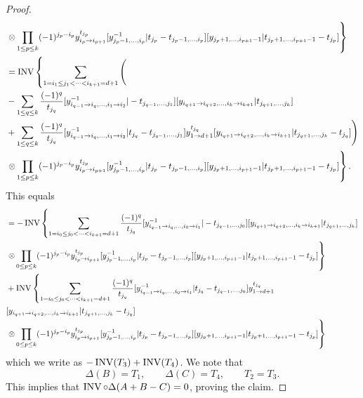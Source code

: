\begin{proof}
\begin{equation}
\begin{aligned}
&\left.\otimes\prod_{1\leq p\leq k}(-1)^{j_p-i_p}y_{i_p\to i_{p+1}}^{t_{j_p}}[y_{j_p-1,\dots,i_p}^{-1}|t_{j_p}-t_{j_p-1,\dots,i_p}][y_{j_p+1,\dots,i_{p+1}-1}|t_{j_p+1,\dots,i_{p+1}-1}-t_{j_p}]\right\}\\
&=\operatorname{INV}\left\{\sum_{1=i_1\leq j_1<\dots<i_{k+1}=d+1}\Bigg(\right.\\
&-\sum_{1\leq q\leq k}\frac{(-1)^q}{t_{j_q}}[y_{i_{q-1}\to i_q,\dots,i_1\to i_2}^{-1}|-t_{j_{q-1},\dots,j_1}][y_{i_{q+1}\to i_{q+2},\dots,i_k\to i_{k+1}}|t_{j_{q+1},\dots,j_k}]\\
&+\sum_{1\leq q\leq k}\frac{(-1)^q}{t_{j_q}}[y_{i_{q-1}\to i_q,\dots,i_1\to i_2}^{-1}|t_{j_q}-t_{j_{q-1},\dots,j_1}]y_{1\to d+1}^{t_{j_q}}[y_{i_{q+1}\to i_{q+2},\dots,i_k\to i_{k+1}}|t_{j_{q+1},\dots,j_k}-t_{j_q}]\Bigg)\\
&\left.\otimes\prod_{1\leq p\leq k}(-1)^{j_p-i_p}y_{i_p\to i_{p+1}}^{t_{j_p}}[y_{j_p-1,\dots,i_p}^{-1}|t_{j_p}-t_{j_p-1,\dots,i_p}][y_{j_p+1,\dots,i_{p+1}-1}|t_{j_p+1,\dots,i_{p+1}-1}-t_{j_p}]\right\}.
\end{aligned}
\end{equation}
This equals
\begin{equation}
\begin{aligned}
&=-\operatorname{INV}\left\{\sum_{1=i_0\leq j_0<\dots<i_{k+1}=d+1}\frac{(-1)^q}{t_{j_q}}[y_{i_{q-1}\to i_q,\dots,i_0\to i_1}^{-1}|-t_{j_{q-1},\dots,j_0}][y_{i_{q+1}\to i_{q+2},\dots,i_k\to i_{k+1}}|t_{j_{q+1},\dots,j_k}]\right.\\
&\left.\otimes\prod_{0\leq p\leq k}(-1)^{j_p-i_p}y_{i_p\to i_{p+1}}^{t_{j_p}}[y_{j_p-1,\dots,i_p}^{-1}|t_{j_p}-t_{j_p-1,\dots,i_p}][y_{j_p+1,\dots,i_{p+1}-1}|t_{j_p+1,\dots,i_{p+1}-1}-t_{j_p}]\right\}\\
&+\operatorname{INV}\left\{\sum_{1=i_0\leq j_0<\dots<i_{k+1}=d+1}\frac{(-1)^q}{t_{j_q}}[y_{i_{q-1}\to i_q,\dots,i_0\to i_1}^{-1}|t_{j_q}-t_{j_{q-1},\dots,j_0}]y_{1\to d+1}^{t_{j_q}}\right.\\
&[y_{i_{q+1}\to i_{q+2},\dots,i_k\to i_{k+1}}|t_{j_{q+1},\dots,j_k}-t_{j_q}]\\
&\left.\otimes\prod_{0\leq p\leq k}(-1)^{j_p-i_p}y_{i_p\to i_{p+1}}^{t_{j_p}}[y_{j_p-1,\dots,i_p}^{-1}|t_{j_p}-t_{j_p-1,\dots,i_p}][y_{j_p+1,\dots,i_{p+1}-1}|t_{j_p+1,\dots,i_{p+1}-1}-t_{j_p}]\right\}
\end{aligned}
\end{equation}
which we write as $-\operatorname{INV}(T_3)+\operatorname{INV}(T_4)$. We note that 
\begin{equation}
    \Delta(B)=T_1,\qquad \Delta(C)=T_4,\qquad T_2=T_3.
\end{equation}
This implies that $\operatorname{INV}\circ\Delta(A+B-C)=0$, proving the claim.
\end{proof}

